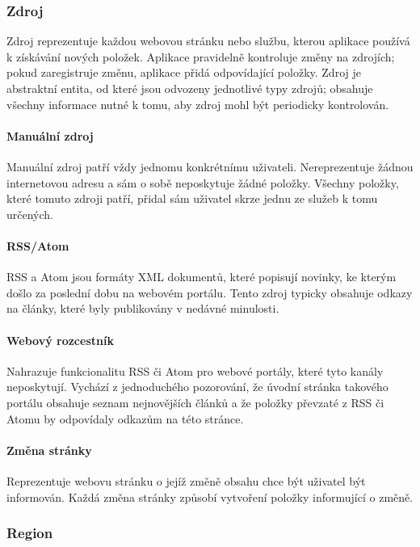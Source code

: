 \subsubsection{Zdroj}

Zdroj reprezentuje každou webovou stránku nebo službu, kterou aplikace používá k získávání nových položek.
Aplikace pravidelně kontroluje změny na zdrojích; pokud zaregistruje změnu, aplikace přidá odpovídající položky.
Zdroj je abstraktní entita, od které jsou odvozeny jednotlivé typy zdrojů; obsahuje všechny informace nutné k tomu, aby zdroj mohl být periodicky kontrolován.

\paragraph{Manuální zdroj}

Manuální zdroj patří vždy jednomu konkrétnímu uživateli.
Nereprezentuje žádnou internetovou adresu a sám o sobě neposkytuje žádné položky.
Všechny položky, které tomuto zdroji patří, přidal sám uživatel skrze jednu ze služeb k tomu určených.

\paragraph{RSS/Atom}

RSS a Atom jsou formáty XML dokumentů, které popisují novinky, ke kterým došlo za poslední dobu na webovém portálu.
Tento zdroj typicky obsahuje odkazy na články, které byly publikovány v nedávné minulosti.

\paragraph{Webový rozcestník}

Nahrazuje funkcionalitu RSS či Atom pro webové portály, které tyto kanály neposkytují.
Vychází z jednoduchého pozorování, že úvodní stránka takového portálu obsahuje seznam nejnovějších článků a že položky převzaté z RSS či Atomu by odpovídaly odkazům na této stránce.

\paragraph{Změna stránky}

Reprezentuje webovu stránku o jejíž změně obsahu chce být uživatel být informován.
Každá změna stránky způsobí vytvoření položky informující o změně.

\subsubsection{Region}

